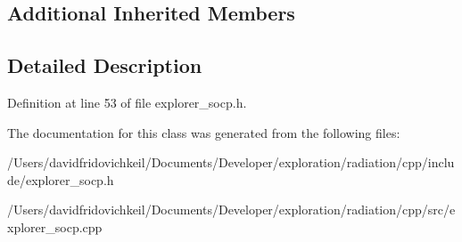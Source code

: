 \subsection*{Additional Inherited Members}


\subsection{Detailed Description}


Definition at line 53 of file explorer\+\_\+socp.\+h.



The documentation for this class was generated from the following files\+:\begin{DoxyCompactItemize}
\item 
/\+Users/davidfridovichkeil/\+Documents/\+Developer/exploration/radiation/cpp/include/explorer\+\_\+socp.\+h\item 
/\+Users/davidfridovichkeil/\+Documents/\+Developer/exploration/radiation/cpp/src/explorer\+\_\+socp.\+cpp\end{DoxyCompactItemize}
